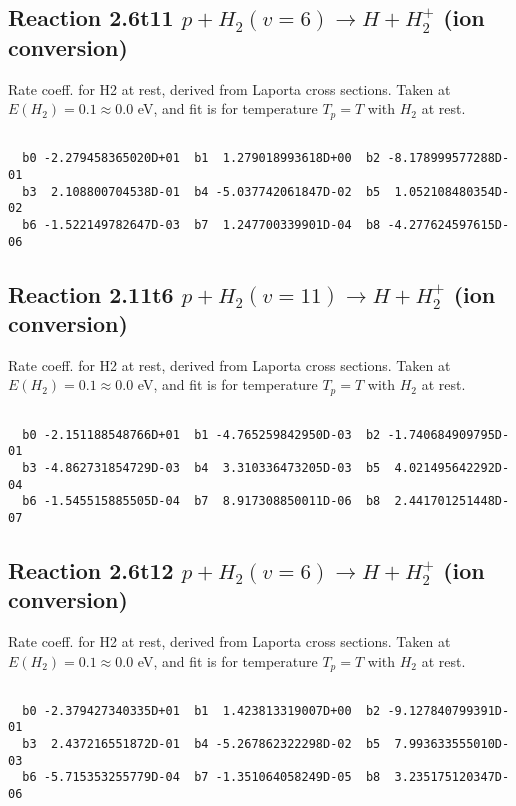 \documentclass[12pt,dvipdfmx]{article}
\begin{document}
\newpage
\subsection{
Reaction 2.6t11
$ p + H_2(v=6) \rightarrow H + H_2^+$ (ion conversion)
}
Rate coeff. for H2 at rest, derived from Laporta cross sections.
Taken at $E(H_2) = 0.1 \approx 0.0$ eV,  and fit is for temperature $T_p=T$ with $H_2$ at rest.

\begin{small}\begin{verbatim}

  b0 -2.279458365020D+01  b1  1.279018993618D+00  b2 -8.178999577288D-01
  b3  2.108800704538D-01  b4 -5.037742061847D-02  b5  1.052108480354D-02
  b6 -1.522149782647D-03  b7  1.247700339901D-04  b8 -4.277624597615D-06

\end{verbatim}\end{small}

\newpage
\subsection{
Reaction 2.11t6
$ p + H_2(v=11) \rightarrow H + H_2^+$ (ion conversion)
}
Rate coeff. for H2 at rest, derived from Laporta cross sections.
Taken at $E(H_2) = 0.1 \approx 0.0$ eV,  and fit is for temperature $T_p=T$ with $H_2$ at rest.

\begin{small}\begin{verbatim}

  b0 -2.151188548766D+01  b1 -4.765259842950D-03  b2 -1.740684909795D-01
  b3 -4.862731854729D-03  b4  3.310336473205D-03  b5  4.021495642292D-04
  b6 -1.545515885505D-04  b7  8.917308850011D-06  b8  2.441701251448D-07

\end{verbatim}\end{small}

\newpage
\subsection{
Reaction 2.6t12
$ p + H_2(v=6) \rightarrow H + H_2^+$ (ion conversion)
}
Rate coeff. for H2 at rest, derived from Laporta cross sections.
Taken at $E(H_2) = 0.1 \approx 0.0$ eV,  and fit is for temperature $T_p=T$ with $H_2$ at rest.

\begin{small}\begin{verbatim}

  b0 -2.379427340335D+01  b1  1.423813319007D+00  b2 -9.127840799391D-01
  b3  2.437216551872D-01  b4 -5.267862322298D-02  b5  7.993633555010D-03
  b6 -5.715353255779D-04  b7 -1.351064058249D-05  b8  3.235175120347D-06

\end{verbatim}\end{small}
\end{document}
